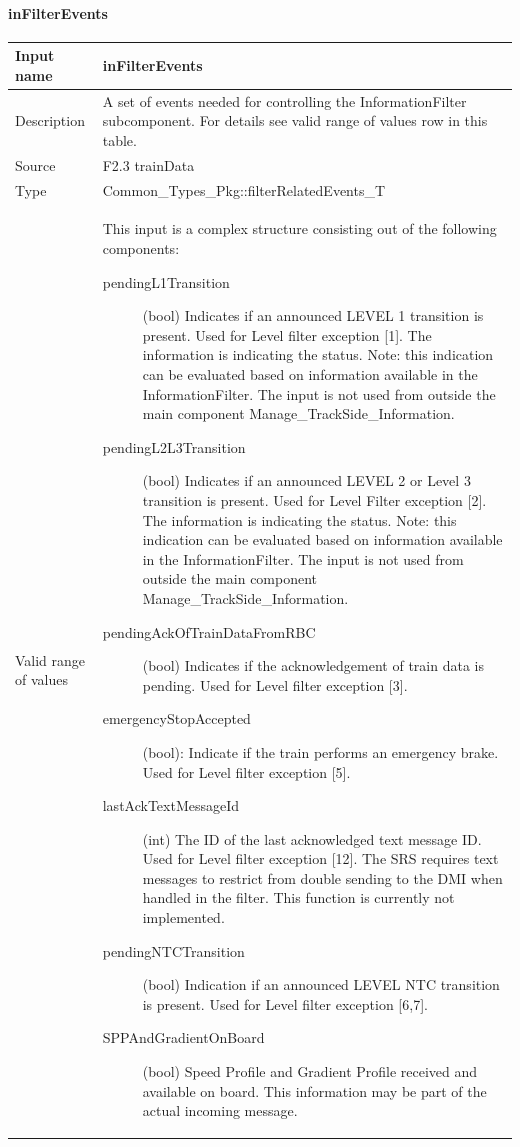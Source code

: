\paragraph{inFilterEvents}

\begin{longtable}{p{}p{}}
\toprule
Input name			& inFilterEvents \\
\midrule
Description			& A set of events needed for controlling the InformationFilter subcomponent. For details see valid range of values row in this table.\\
\midrule
Source				& F2.3 trainData
\\  
\midrule
Type					& Common\_Types\_Pkg::filterRelatedEvents\_T\\
\midrule
Valid range of values	& This input is a complex structure consisting out of the following components:
\begin{description}
\item[pendingL1Transition](bool) Indicates if an announced LEVEL 1 transition is present. Used for Level filter exception [1]. The information is indicating the status.
Note: this indication can be evaluated based on information available in the InformationFilter. The input is not used from outside the main component Manage\_TrackSide\_Information.
\item[pendingL2L3Transition](bool) Indicates if an announced LEVEL 2 or Level 3 transition is present. Used for Level Filter exception [2]. The information is indicating the status.
Note: this indication can be evaluated based on information available in the InformationFilter. The input is not used from outside the main component Manage\_TrackSide\_Information.
\item[pendingAckOfTrainDataFromRBC](bool) Indicates if the acknowledgement of train data is pending. Used for Level filter exception [3].
\item[emergencyStopAccepted](bool): Indicate if the train performs an emergency brake. Used for Level filter exception [5].
\item[lastAckTextMessageId](int) The ID of the last acknowledged text message ID. Used for Level filter exception [12]. The SRS requires text messages to restrict from double sending to the DMI when handled in the filter. This function is currently not implemented. 
\item[pendingNTCTransition](bool) Indication if an announced LEVEL NTC transition is present. Used for Level filter exception [6,7].
\item[SPPAndGradientOnBoard](bool) Speed Profile and Gradient Profile received and available on board. This information may be part of the actual incoming message.

\end{description}
\end{longtable}
